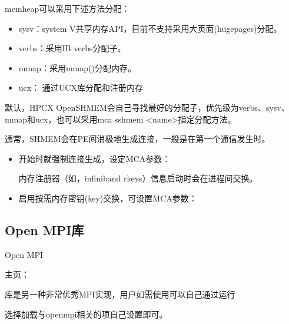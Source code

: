 \documentclass[a4paper,12pt,english]{sphinxmanual}
\begin{document}
\sphinxAtStartPar
{}

\sphinxAtStartPar
memheap可以采用下述方法分配：
\begin{itemize}
\item {} 
\sphinxAtStartPar
sysv：system V共享内存API，目前不支持采用大页面(hugepages)分配。

\item {} 
\sphinxAtStartPar
verbs：采用IB verbs分配子。

\item {} 
\sphinxAtStartPar
mmap：采用mmap()分配内存。

\item {} 
\sphinxAtStartPar
ucx： 通过UCX库分配和注册内存

\end{itemize}

\sphinxAtStartPar
默认，HPC\sphinxhyphen{}X OpenSHMEM会自己寻找最好的分配子，优先级为verbs、sysv、mmap和ucx，也可以采用\sphinxhyphen{}mca sshmem <name>指定分配方法。

\sphinxAtStartPar
{}

\sphinxAtStartPar
通常，SHMEM会在PE间消极地生成连接，一般是在第一个通信发生时。
\begin{itemize}
\item {} 
\sphinxAtStartPar
开始时就强制连接生成，设定MCA参数：

\sphinxAtStartPar
{}

\sphinxAtStartPar
内存注册器（如，infiniband rkeys）信息启动时会在进程间交换。

\item {} 
\sphinxAtStartPar
启用按需内存密钥(key)交换，可设置MCA参数：

\sphinxAtStartPar
{}

\end{itemize}


\subsection{Open MPI库}
\label{\detokenize{mpi-application/mpi-application:open-mpi}}\label{\detokenize{mpi-application/mpi-application:openmpi}}
\begin{DUlineblock}{0em}
\item[] Open MPI %
\begin{footnote}[2]\sphinxAtStartFootnote
主页：
%
\end{footnote} 库是另一种非常优秀MPI实现，用户如需使用可以自己通过运行
\item[] 选择加载与openmpi相关的项自己设置即可。
\end{DUlineblock}
\end{document}
